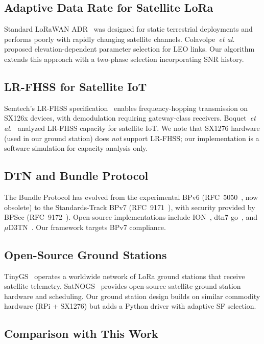 \documentclass[11pt,a4paper]{article}
\begin{document}
\subsection{Adaptive Data Rate for Satellite LoRa}

Standard LoRaWAN ADR~\cite{lorawan_spec} was designed for static terrestrial deployments and performs poorly with rapidly changing satellite channels. Colavolpe~\emph{et al.}~\cite{colavolpe2019} proposed elevation-dependent parameter selection for LEO links. Our algorithm extends this approach with a two-phase selection incorporating SNR history.

\subsection{LR-FHSS for Satellite IoT}

Semtech's LR-FHSS specification~\cite{semtech_lrfhss} enables frequency-hopping transmission on SX126x devices, with demodulation requiring gateway-class receivers. Boquet~\emph{et al.}~\cite{boquet2021} analyzed LR-FHSS capacity for satellite IoT. We note that SX1276 hardware (used in our ground station) does \emph{not} support LR-FHSS; our implementation is a software simulation for capacity analysis only.

\subsection{DTN and Bundle Protocol}

The Bundle Protocol has evolved from the experimental BPv6 (RFC~5050~\cite{rfc5050}, now obsolete) to the Standards-Track BPv7 (RFC~9171~\cite{rfc9171}), with security provided by BPSec (RFC~9172~\cite{rfc9172}). Open-source implementations include ION~\cite{ion_dtn}, dtn7-go~\cite{dtn7go}, and $\mu$D3TN~\cite{ud3tn}. Our framework targets BPv7 compliance.

\subsection{Open-Source Ground Stations}

TinyGS~\cite{tinygs} operates a worldwide network of LoRa ground stations that receive satellite telemetry. SatNOGS~\cite{satnogs} provides open-source satellite ground station hardware and scheduling. Our ground station design builds on similar commodity hardware (RPi + SX1276) but adds a Python driver with adaptive SF selection.

\subsection{Comparison with This Work}
\end{document}
